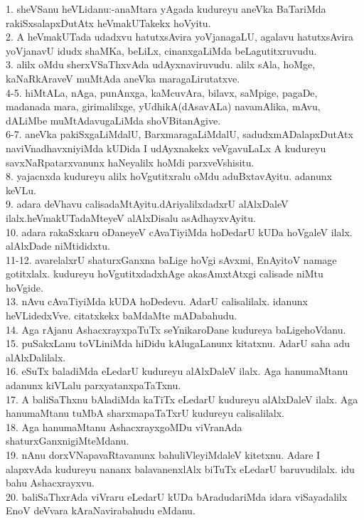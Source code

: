 \documentclass{article}
\begin{document}
1. sheVSanu heVLidanu:-anaMtara yAgada kudureyu aneVka BaTariMda rakiSxsalapxDutAtx heVmakUTakekx hoVyitu.\\
2. A heVmakUTada udadxvu hatutxsAvira yoVjanagaLU, agalavu hatutxsAvira yoVjanavU idudx shaMKa, beLiLx, cinanxgaLiMda beLagutitxruvudu.\\
3. alilx oMdu sherxVSaThxvAda udAyxnaviruvudu. alilx sAla, hoMge, kaNaRkAraveV muMtAda aneVka maragaLirutatxve.\\
4-5. hiMtALa, nAga, punAnxga, kaMcuvAra, bilavx, saMpige, pagaDe, madanada mara, girimalilxge, yUdhikA(dAsavALa) navamAlika, mAvu, dALiMbe muMtAdavugaLiMda shoVBitanAgive.\\
6-7. aneVka pakiSxgaLiMdalU, BarxmaragaLiMdalU, sadudxmADalapxDutAtx naviVnadhavxniyiMda kUDida I udAyxnakekx veVgavuLaLx A kudureyu savxNaRpatarxvanunx haNeyalilx hoMdi parxveVshisitu.\\
8. yajacnxda kudureyu alilx hoVgutitxralu oMdu aduBxtavAyitu. adanunx keVLu.\\
9. adara deVhavu calisadaMtAyitu.dAriyalilxdadxrU alAlxDaleV ilalx.heVmakUTadaMteyeV alAlxDisalu asAdhayxvAyitu.\\
10. adara rakaSxkaru oDaneyeV cAvaTiyiMda hoDedarU kUDa hoVgaleV ilalx. alAlxDade niMtididxtu.\\
11-12. avarelalxrU shaturxGanxna baLige hoVgi sAvxmi, EnAyitoV namage gotitxlalx. kudureyu hoVgutitxdadxhAge akasAmxtAtxgi calisade niMtu hoVgide.\\
13. nAvu cAvaTiyiMda kUDA hoDedevu. AdarU calisalilalx. idanunx heVLidedxVve. citatxkekx baMdaMte mADabahudu.\\
14. Aga rAjanu AshacxrayxpaTuTx seYnikaroDane kudureya baLigehoVdanu.\\
15. puSakxLanu toVLiniMda hiDidu kAlugaLanunx kitatxnu. AdarU saha adu alAlxDalilalx.\\
16. eSuTx baladiMda eLedarU kudureyu alAlxDaleV ilalx. Aga hanumaMtanu adanunx kiVLalu parxyatanxpaTaTxnu.\\
17. A baliSaThxnu bAladiMda kaTiTx eLedarU kudureyu alAlxDaleV ilalx. Aga hanumaMtanu tuMbA sharxmapaTaTxrU kudureyu calisalilalx.\\
18. Aga hanumaMtanu AshacxrayxgoMDu viVranAda shaturxGanxnigiMteMdanu.\\
19. nAnu dorxVNapavaRtavanunx bahuliVleyiMdaleV kitetxnu. Adare I alapxvAda kudureyu nananx balavanenxlAlx biTuTx eLedarU baruvudilalx. idu bahu Ashacxrayxvu.\\
20. baliSaThxrAda viVraru eLedarU kUDa bAradudariMda idara viSayadalilx EnoV deVvara kAraNavirabahudu eMdanu.\\
\end{document}
